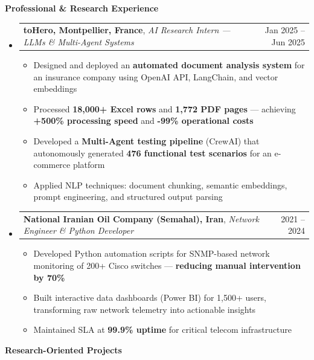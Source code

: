 \documentclass[11pt,a4paper]{article}
\makeatletter
\newcommand{\itemspace}{\vspace{0.4em}}
\newcommand{\sectionspace}{\itemspace}
\newcommand{\subspace}{\vspace{0.5em}}
\newcommand{\cvsection}[1]{
    \sectionspace
    \noindent\textcolor{primary}{\Large \textbf{#1}} \textcolor{primary}{\hrulefill}
    \par\vspace{0.4em}
}
\newcommand{\headerrow}[2]{
    \begin{tabular*}{\linewidth}{l@{\extracolsep{\fill}}r}
    #1 & \textcolor{primary}{#2} \\
    \end{tabular*}
}
\makeatother
\begin{document}
\cvsection{Professional \& Research Experience}
\begin{itemize}[leftmargin=1em, label={}]
    \item
    \headerrow{\textbf{toHero, Montpellier, France}, \emph{AI Research Intern — LLMs \& Multi-Agent Systems}}{Jan 2025 -- Jun 2025}
    \begin{itemize}[leftmargin=1.5em, label=$\bullet$, nosep]
        \item Designed and deployed an \textbf{automated document analysis system} for an insurance company using OpenAI API, LangChain, and vector embeddings
        \item Processed \textbf{18,000+ Excel rows} and \textbf{1,772 PDF pages} — achieving \textbf{+500\% processing speed} and \textbf{-99\% operational costs}
        \item Developed a \textbf{Multi-Agent testing pipeline} (CrewAI) that autonomously generated \textbf{476 functional test scenarios} for an e-commerce platform
        \item Applied NLP techniques: document chunking, semantic embeddings, prompt engineering, and structured output parsing
    \end{itemize}

    \subspace 
    \item
    \headerrow{\textbf{National Iranian Oil Company (Semahal), Iran}, \emph{Network Engineer \& Python Developer}}{2021 -- 2024}
    \begin{itemize}[leftmargin=1.5em, label=$\bullet$, nosep]
        \item Developed Python automation scripts for SNMP-based network monitoring of 200+ Cisco switches — \textbf{reducing manual intervention by 70\%}
        \item Built interactive data dashboards (Power BI) for 1,500+ users, transforming raw network telemetry into actionable insights
        \item Maintained SLA at \textbf{99.9\% uptime} for critical telecom infrastructure
    \end{itemize}
\end{itemize}

\clearpage
\cvsection{Research-Oriented Projects}
\end{document}
